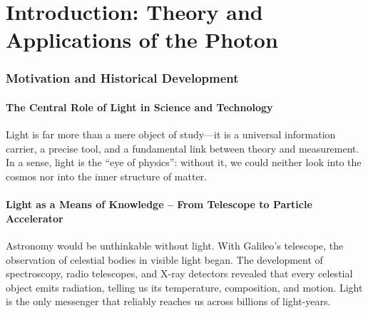 \chapter{Introduction: Theory and Applications of the Photon}

\setcounter{section}{1}
\setcounter{subsection}{0}
\setcounter{subsubsection}{1}
\setcounter{secnumdepth}{3}
\setlength{\parindent}{0pt}


\subsection{Motivation and Historical Development}
\subsubsection{The Central Role of Light in Science and Technology}

Light is far more than a mere object of study—it is a universal information carrier, a precise tool, and a fundamental link between theory and measurement. In a sense, light is the “eye of physics”: without it, we could neither look into the cosmos nor into the inner structure of matter.

\subsubsection*{Light as a Means of Knowledge – From Telescope to Particle Accelerator}
Astronomy would be unthinkable without light. With Galileo’s telescope, the observation of celestial bodies in visible light began. The development of spectroscopy, radio telescopes, and X-ray detectors revealed that every celestial object emits radiation, telling us its temperature, composition, and motion. Light is the only messenger that reliably reaches us across billions of light-years.

